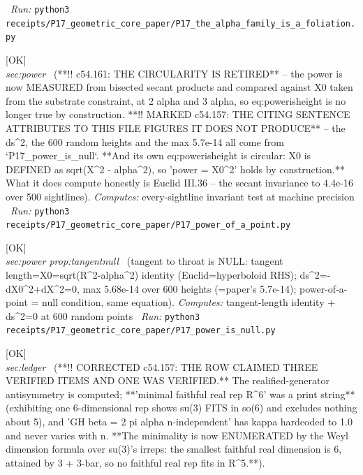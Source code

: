 \begin{description}
\ \emph{Run:} \texttt{python3 receipts/P17\_geometric\_core\_paper/P17\_the\_alpha\_family\_is\_a\_foliation.py}
\item[\label{rcpt:P17_power_of_a_point}\texttt{P17\_power\_of\_a\_point}]\hfill\textsf{[OK]}\\
\textit{sec:power} \ (**!! c54.161: THE CIRCULARITY IS RETIRED** -- the power is now MEASURED from bisected secant products and compared against X0 taken from the substrate constraint, at 2 alpha and 3 alpha, so eq:powerisheight is no longer true by construction. **!! MARKED c54.157: THE CITING SENTENCE ATTRIBUTES TO THIS FILE FIGURES IT DOES NOT PRODUCE** -- the ds\textasciicircum{}2, the 600 random heights and the max 5.7e-14 all come from `P17\_power\_is\_null`. **And its own eq:powerisheight is circular: X0 is DEFINED as sqrt(\textbar{}X\textbar{}\textasciicircum{}2 - alpha\textasciicircum{}2), so 'power = X0\textasciicircum{}2' holds by construction.** What it does compute honestly is Euclid III.36 -- the secant invariance to 4.4e-16 over 500 sightlines). 
\emph{Computes:} every-sightline invariant test at machine precision
\ \emph{Run:} \texttt{python3 receipts/P17\_geometric\_core\_paper/P17\_power\_of\_a\_point.py}
\item[\label{rcpt:P17_power_is_null}\texttt{P17\_power\_is\_null}]\hfill\textsf{[OK]}\\
\textit{sec:power prop:tangentnull} \ (tangent to throat is NULL: tangent length=\textbar{}X0\textbar{}=sqrt(R\textasciicircum{}2-alpha\textasciicircum{}2) identity (Euclid=hyperboloid RHS); ds\textasciicircum{}2=-dX0\textasciicircum{}2+\textbar{}dX\textbar{}\textasciicircum{}2=0, max 5.68e-14 over 600 heights (=paper's 5.7e-14); power-of-a-point = null condition, same equation). 
\emph{Computes:} tangent-length identity + ds\textasciicircum{}2=0 at 600 random points
\ \emph{Run:} \texttt{python3 receipts/P17\_geometric\_core\_paper/P17\_power\_is\_null.py}
\item[\label{rcpt:P17_qm_S4_vs_S5}\texttt{P17\_qm\_S4\_vs\_S5}]\hfill\textsf{[OK]}\\
\textit{sec:ledger} \ (**!! CORRECTED c54.157: THE ROW CLAIMED THREE VERIFIED ITEMS AND ONE WAS VERIFIED.** The realified-generator antisymmetry is computed; **'minimal faithful real rep R\textasciicircum{}6' was a print string** (exhibiting one 6-dimensional rep shows su(3) FITS in so(6) and excludes nothing about 5), and 'GH beta = 2 pi alpha n-independent' has kappa hardcoded to 1.0 and never varies with n. **The minimality is now ENUMERATED by the Weyl dimension formula over su(3)'s irreps: the smallest faithful real dimension is 6, attained by 3 + 3-bar, so no faithful real rep fits in R\textasciicircum{}5.**). 

\end{description}
